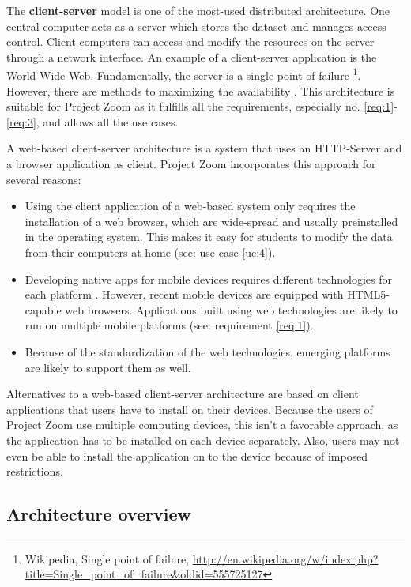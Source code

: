 The \textbf{client-server} \cite{Berson_1996} model is one of the most-used distributed architecture. One central computer acts as a server which stores the dataset and manages access control. Client computers can access and modify the resources on the server through a network interface. An example of a client-server application is the World Wide Web. Fundamentally, the server is a single point of failure \footnote{Wikipedia, Single point of failure, \url{http://en.wikipedia.org/w/index.php?title=Single_point_of_failure&oldid=555725127}}. However, there are methods to maximizing the availability \cite{Gray_1991} \cite{Colyer_2000}. This architecture is suitable for Project Zoom as it fulfills all the requirements, especially no. \ref{req:1}-\ref{req:3}, and allows all the use cases.

A web-based client-server architecture is a system that uses an HTTP-Server \cite{RFC2616} and a browser application as client. Project Zoom incorporates this approach for several reasons:
\begin{itemize}
\item Using the client application of a web-based system only requires the installation of a web browser, which are wide-spread and usually preinstalled in the operating system. This makes it easy for students to modify the data from their computers at home (see: use case \ref{uc:4}).
\item Developing native apps for mobile devices requires different technologies for each platform \cite{Charland_2011}. However, recent mobile devices are equipped with HTML5-capable \cite{W3C_HTML5} web browsers. Applications built using web technologies are likely to run on multiple mobile platforms (see: requirement \ref{req:1}).
\item Because of the standardization of the web technologies, emerging platforms are likely to support them as well.
\end{itemize}

Alternatives to a web-based client-server architecture are based on client applications that users have to install on their devices. Because the users of Project Zoom use multiple computing devices, this isn't a favorable approach, as the application has to be installed on each device separately. Also, users may not even be able to install the application on to the device because of imposed restrictions.

\subsection{Architecture overview}

